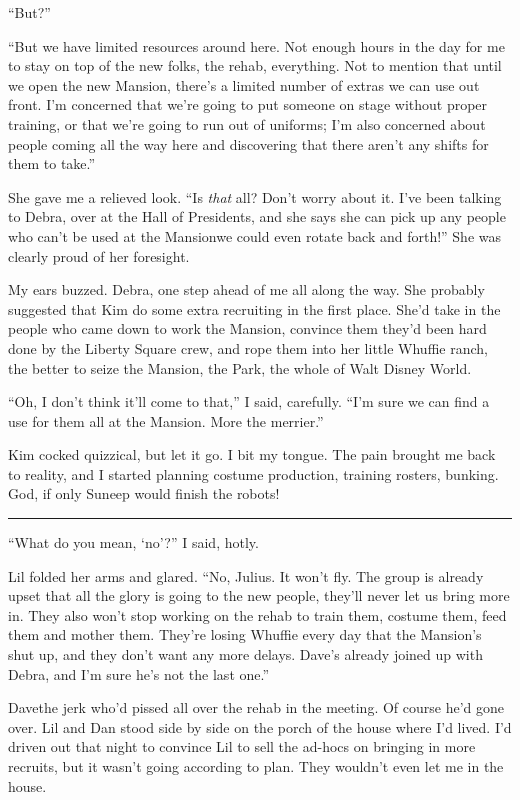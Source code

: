 “But?”

“But we have limited resources around here. Not enough hours in the
day for me to stay on top of the new folks, the rehab, everything.
Not to mention that until we open the new Mansion, there's a
limited number of extras we can use out front. I'm concerned that
we're going to put someone on stage without proper training, or
that we're going to run out of uniforms; I'm also concerned about
people coming all the way here and discovering that there aren't
any shifts for them to take.”

She gave me a relieved look. “Is \emph{that} all? Don't worry about
it. I've been talking to Debra, over at the Hall of Presidents, and
she says she can pick up any people who can't be used at the
Mansion{\dash}we could even rotate back and forth!” She was clearly proud
of her foresight.

My ears buzzed. Debra, one step ahead of me all along the way. She
probably suggested that Kim do some extra recruiting in the first
place. She'd take in the people who came down to work the Mansion,
convince them they'd been hard done by the Liberty Square crew, and
rope them into her little Whuffie ranch, the better to seize the
Mansion, the Park, the whole of Walt Disney World.

“Oh, I don't think it'll come to that,” I said, carefully. “I'm
sure we can find a use for them all at the Mansion. More the
merrier.”

Kim cocked quizzical, but let it go. I bit my tongue. The pain
brought me back to reality, and I started planning costume
production, training rosters, bunking. God, if only Suneep would
finish the robots!

\begin{center}\rule{1in}{0.4pt}\end{center}

“What do you mean, ‘no’?” I said, hotly.

Lil folded her arms and glared. “No, Julius. It won't fly. The
group is already upset that all the glory is going to the new
people, they'll never let us bring more in. They also won't stop
working on the rehab to train them, costume them, feed them and
mother them. They're losing Whuffie every day that the Mansion's
shut up, and they don't want any more delays. Dave's already joined
up with Debra, and I'm sure he's not the last one.”

Dave{\dash}the jerk who'd pissed all over the rehab in the meeting. Of
course he'd gone over. Lil and Dan stood side by side on the porch
of the house where I'd lived. I'd driven out that night to convince
Lil to sell the ad-hocs on bringing in more recruits, but it wasn't
going according to plan. They wouldn't even let me in the house.

